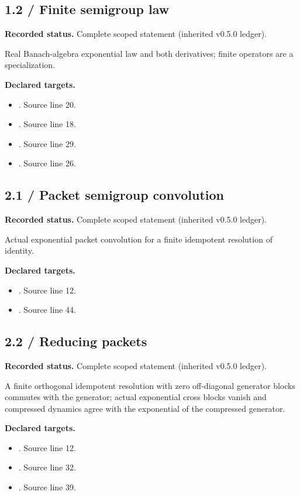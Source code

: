 \subsection{1.2 / Finite semigroup law}
\label{result:1.2}
\textbf{Recorded status.} Complete scoped statement (inherited v0.5.0 ledger).\par
Real Banach-algebra exponential law and both derivatives; finite operators are a specialization.

\textbf{Declared targets.}\begin{itemize}
\item {}. Source line 20.
\item {}. Source line 18.
\item {}. Source line 29.
\item {}. Source line 26.
\end{itemize}
\subsection{2.1 / Packet semigroup convolution}
\label{result:2.1}
\textbf{Recorded status.} Complete scoped statement (inherited v0.5.0 ledger).\par
Actual exponential packet convolution for a finite idempotent resolution of identity.

\textbf{Declared targets.}\begin{itemize}
\item {}. Source line 12.
\item {}. Source line 44.
\end{itemize}
\subsection{2.2 / Reducing packets}
\label{result:2.2}
\textbf{Recorded status.} Complete scoped statement (inherited v0.5.0 ledger).\par
A finite orthogonal idempotent resolution with zero off-diagonal generator blocks commutes with the generator; actual exponential cross blocks vanish and compressed dynamics agree with the exponential of the compressed generator.

\textbf{Declared targets.}\begin{itemize}
\item {}. Source line 12.
\item {}. Source line 32.
\item {}. Source line 39.
\end{itemize}
